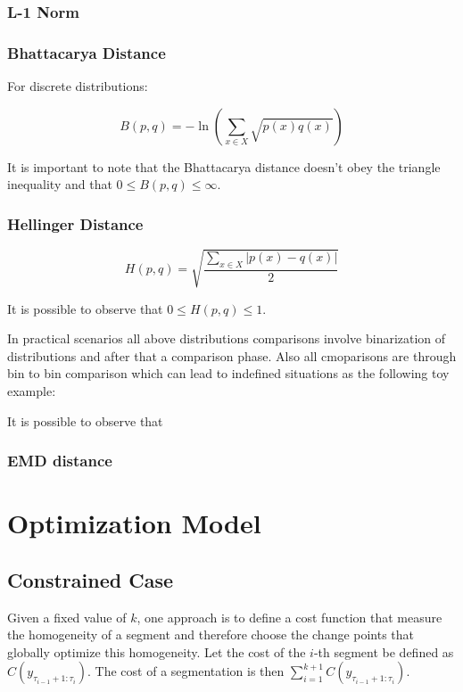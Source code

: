 \subsubsection{L-1 Norm}

\subsubsection{Bhattacarya Distance}

For discrete distributions:

\begin{equation}
    B(p, q) = - \ln \left( \sum \limits_{x \in X} \sqrt{p(x) q(x)} \right)
\end{equation}

It is important to note that the Bhattacarya distance doesn't obey the triangle inequality and that $0 \leq B(p, q) \leq \infty$.

\subsubsection{Hellinger Distance}

\begin{equation}
    H(p, q) = \sqrt{\frac{\sum \limits_{x \in X} |p(x) - q(x)|}{2}}
\end{equation}

It is possible to observe that $0 \leq H(p, q) \leq 1$.

In practical scenarios all above distributions comparisons involve binarization of distributions and after that a comparison phase. Also all cmoparisons are through bin to bin comparison which can lead to indefined situations as the following toy example: 

It is possible to observe that 

\subsubsection{EMD distance}

\section{Optimization Model}  

\subsection{Constrained Case}

Given a fixed value of $k$, one approach is to define a cost function that measure the homogeneity of a segment and therefore choose the change points that globally optimize this homogeneity. Let the cost of the $i$-th segment be defined as $C(y_{\tau_{i - 1} + 1 : \tau_{i}})$. The cost of a segmentation is then $\sum \limits_{i = 1}^{k + 1} C(y_{\tau_{i - 1} + 1 : \tau_{i}})$.

